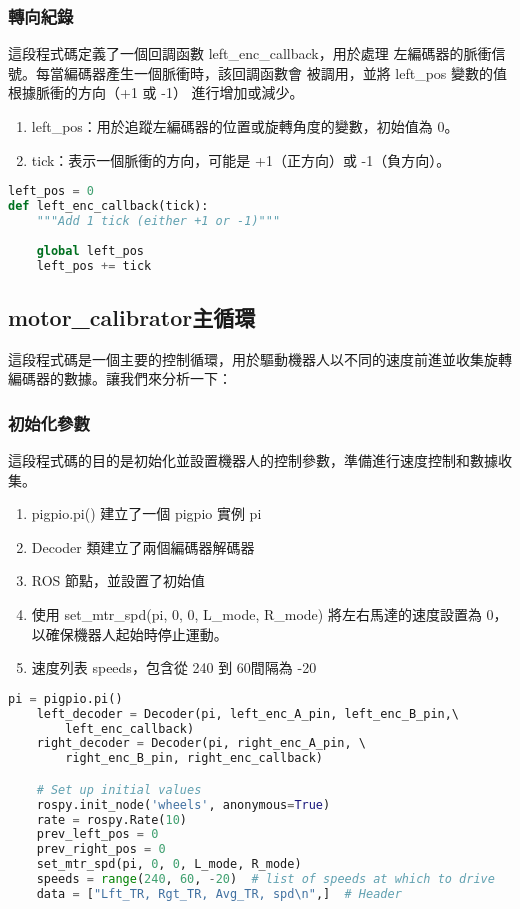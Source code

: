 \subsubsection{轉向紀錄}
這段程式碼定義了一個回調函數 left\_enc\_callback，用於處理
左編碼器的脈衝信號。每當編碼器產生一個脈衝時，該回調函數會
被調用，並將 left\_pos 變數的值根據脈衝的方向（+1 或 -1）
進行增加或減少。
\begin{enumerate}
    \item left\_pos：用於追蹤左編碼器的位置或旋轉角度的變數，初始值為 0。
    \item tick：表示一個脈衝的方向，可能是 +1（正方向）或 -1（負方向）。
\end{enumerate}
\begin{lstlisting}[language=Python, caption=轉向記錄]
   left_pos = 0
def left_enc_callback(tick):
    """Add 1 tick (either +1 or -1)"""
    
    global left_pos
    left_pos += tick 
\end{lstlisting}

\subsection{motor\_calibrator主循環}
這段程式碼是一個主要的控制循環，用於驅動機器人以不同的速度前進並收集旋轉編碼器的數據。讓我們來分析一下：

\subsubsection{初始化參數}
這段程式碼的目的是初始化並設置機器人的控制參數，準備進行速度控制和數據收集。
\begin{enumerate}
    \item pigpio.pi() 建立了一個 pigpio 實例 pi 
    \item  Decoder 類建立了兩個編碼器解碼器
    \item  ROS 節點，並設置了初始值
    \item 使用 set\_mtr\_spd(pi, 0, 0, L\_mode, R\_mode) 將左右馬達的速度設置為 0，以確保機器人起始時停止運動。
    \item 速度列表 speeds，包含從 240 到 60間隔為 -20 
\end{enumerate}
\begin{lstlisting}[language=Python, caption=初始化]
    pi = pigpio.pi()
    left_decoder = Decoder(pi, left_enc_A_pin, left_enc_B_pin,\ 
        left_enc_callback)
    right_decoder = Decoder(pi, right_enc_A_pin, \ 
        right_enc_B_pin, right_enc_callback)

    # Set up initial values
    rospy.init_node('wheels', anonymous=True)
    rate = rospy.Rate(10)
    prev_left_pos = 0
    prev_right_pos = 0
    set_mtr_spd(pi, 0, 0, L_mode, R_mode)
    speeds = range(240, 60, -20)  # list of speeds at which to drive
    data = ["Lft_TR, Rgt_TR, Avg_TR, spd\n",]  # Header

\end{lstlisting}

